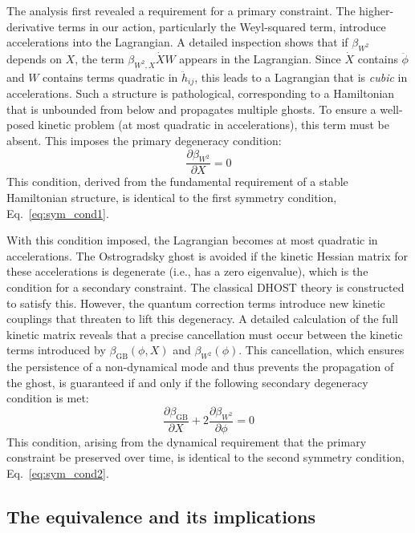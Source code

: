 \documentclass[twocolumn]{aastex631}
\begin{document}
The analysis first revealed a requirement for a primary constraint. The higher-derivative terms in our action, particularly the Weyl-squared term, introduce accelerations into the Lagrangian. A detailed inspection shows that if $\beta_{W^2}$ depends on $X$, the term $\beta_{W^2,X} \dot{X} W$ appears in the Lagrangian. Since $\dot{X}$ contains $\ddot{\phi}$ and $W$ contains terms quadratic in $\ddot{h}_{ij}$, this leads to a Lagrangian that is \textit{cubic} in accelerations. Such a structure is pathological, corresponding to a Hamiltonian that is unbounded from below and propagates multiple ghosts. To ensure a well-posed kinetic problem (at most quadratic in accelerations), this term must be absent. This imposes the primary degeneracy condition:
\begin{equation}
    \frac{\partial\beta_{W^2}}{\partial X} = 0
\end{equation}
This condition, derived from the fundamental requirement of a stable Hamiltonian structure, is identical to the first symmetry condition, Eq.~\eqref{eq:sym_cond1}.

With this condition imposed, the Lagrangian becomes at most quadratic in accelerations. The Ostrogradsky ghost is avoided if the kinetic Hessian matrix for these accelerations is degenerate (i.e., has a zero eigenvalue), which is the condition for a secondary constraint. The classical DHOST theory is constructed to satisfy this. However, the quantum correction terms introduce new kinetic couplings that threaten to lift this degeneracy. A detailed calculation of the full kinetic matrix reveals that a precise cancellation must occur between the kinetic terms introduced by $\beta_{\text{GB}}(\phi,X)$ and $\beta_{W^2}(\phi)$. This cancellation, which ensures the persistence of a non-dynamical mode and thus prevents the propagation of the ghost, is guaranteed if and only if the following secondary degeneracy condition is met:
\begin{equation}
    \frac{\partial\beta_{\text{GB}}}{\partial X} + 2 \frac{\partial\beta_{W^2}}{\partial\phi} = 0
\end{equation}
This condition, arising from the dynamical requirement that the primary constraint be preserved over time, is identical to the second symmetry condition, Eq.~\eqref{eq:sym_cond2}.

\subsection{The equivalence and its implications}
\end{document}
